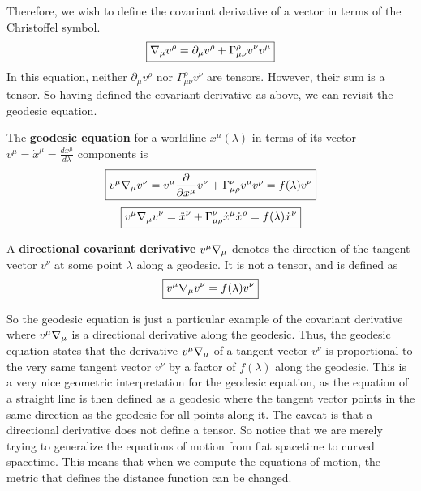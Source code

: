 \documentclass{article}
\begin{document}
 			Therefore, we wish to define the covariant derivative of a vector in terms of the Christoffel symbol.
 			\begin{equation}
 				\label{eq:CovariantChristoffel}
 				\boxed{\nabla_\mu v^\rho = \partial_\mu v^\rho + \Gamma_{\mu\nu}^\rho v^\nu v^\mu}
 			\end{equation}
 			In this equation, neither $\partial_\mu v^\rho$ nor $\Gamma_{\mu\nu}^\rho v^\nu$ are tensors. However, their sum is a tensor. So having defined the covariant derivative as above, we can revisit the geodesic equation.
 			\begin{defn}
 				The \textbf{geodesic equation} for a worldline $x^\mu (\lambda)$ in terms of its vector $v^\mu = \dot{x}^\mu = \frac{dx^\mu}{d\lambda}$ components is
 				\begin{equation}
 					\label{eq:VectorGeodesic}
 					\boxed{v^\mu \nabla_\mu v^\nu = v^\mu \frac{\partial}{\partial x^\mu} v^\nu + \Gamma_{\mu\rho}^\nu v^\mu v^\rho = f(\lambda)v^\nu}
 				\end{equation}
 				$$ \boxed{v^\mu \nabla_\mu v^\nu = \ddot{x}^\nu + \Gamma_{\mu\rho}^\nu \dot{x}^\mu \dot{x}^\rho = f(\lambda)\dot{x}^\nu}$$
 			\end{defn}
 			\begin{defn}
 				A \textbf{directional covariant derivative} $v^\mu \nabla_\mu$ denotes the direction of the tangent vector $v^\nu$ at some point $\lambda$ along a geodesic. It is not a tensor, and is defined as 
 				\begin{equation}
 					\boxed{v^\mu \nabla_\mu v^\nu = f(\lambda)v^\nu}
 				\end{equation}
 			\end{defn}
 			So the geodesic equation is just a particular example of the covariant derivative where $v^\mu \nabla_\mu$ is a directional derivative along the geodesic. Thus, the geodesic equation states that the derivative $v^\mu \nabla_\mu$ of a tangent vector $v^\nu$ is proportional to the very same tangent vector $v^\nu$ by a factor of $f(\lambda)$ along the geodesic. This is a very nice geometric interpretation for the geodesic equation, as the equation of a straight line is then defined as a geodesic where the tangent vector points in the same direction as the geodesic for all points along it. The caveat is that a directional derivative does not define a tensor. So notice that we are merely trying to generalize the equations of motion from flat spacetime to curved spacetime. This means that when we compute the equations of motion, the metric that defines the distance function can be changed.
 			
\end{document}
